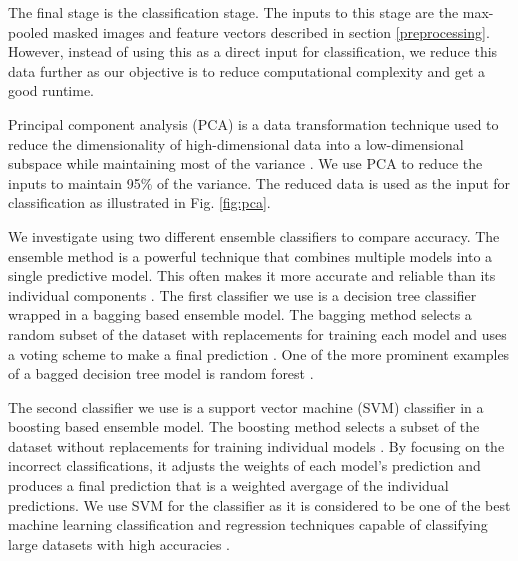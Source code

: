 The final stage is the classification stage. The inputs to this stage are the max-pooled masked images and feature vectors described in section \ref{preprocessing}. However, instead of using this as a direct input for classification, we reduce this data further as our objective is to reduce computational complexity and get a good runtime.

Principal component analysis (PCA) is a data transformation technique used to reduce the dimensionality of high-dimensional data into a low-dimensional subspace while maintaining most of the variance \cite{b5_1,b5_2}. We use PCA to reduce the inputs to maintain 95\% of the variance. The reduced data is used as the input for classification as illustrated in Fig. \ref{fig:pca}.

We investigate using two different ensemble classifiers to compare accuracy. The ensemble method is a powerful technique that combines multiple models into a single predictive model. This often makes it more accurate and reliable than its individual components \cite{b5_3}. The first classifier we use is a decision tree classifier wrapped in a bagging based ensemble model. The bagging method selects a random subset of the dataset with replacements for training each model and uses a voting scheme to make a final prediction \cite{b5_4}. One of the more prominent examples of a bagged decision tree model is random forest \cite{b5_5}.

The second classifier we use is a support vector machine (SVM) classifier in a boosting based ensemble model. The boosting method selects a subset of the dataset without replacements for training individual models \cite{b5_6}. By focusing on the incorrect classifications, it adjusts the weights of each model's prediction and produces a final prediction that is a weighted avergage of the individual predictions. We use SVM for the classifier as it is considered to be one of the best machine learning classification and regression techniques capable of classifying large datasets with high accuracies \cite{b5_7,b5_8,b5_9}.

